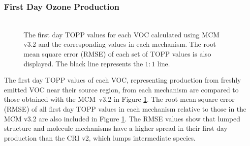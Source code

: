\subsubsection{First Day Ozone Production} \label{sss:day1} %
%
\begin{figure}
    \centering
    \includegraphics[width=\textwidth]{img/first_day_values}
    \vspace{1mm}
    \caption{The first day TOPP values for each VOC calculated using MCM v3.2 and the corresponding values in each mechanism. The root mean square error (RMSE) of each set of TOPP values is also displayed. The black line represents the $1:1$ line.}
    \vspace{-4mm}
    \label{f:first_day}
\end{figure}
%
The first day TOPP values of each VOC, representing  production from freshly emitted VOC near their source region, from each mechanism are compared to those obtained with the \mbox{MCM v3.{2}} in Figure \ref{f:first_day}.
The root mean square error (RMSE) of all first day TOPP values in each mechanism relative to those in the MCM v3.2 are also included in Figure \ref{f:first_day}.  
The RMSE values show that lumped structure and molecule mechanisms have a higher spread in their first day  production than the CRI v2, which lumps intermediate species.

